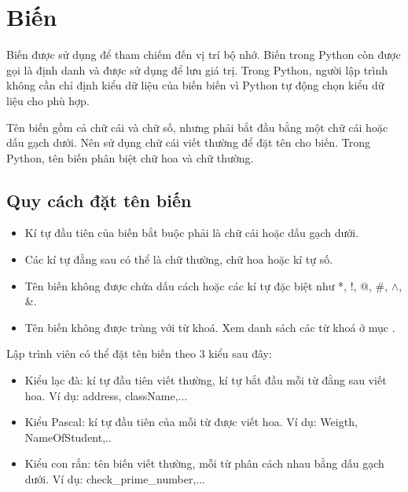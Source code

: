 \section{Biến}
Biến được sử dụng để tham chiếm đến vị trí bộ nhớ. Biến trong Python còn được gọi là định danh và được sử dụng để lưu giá trị. Trong Python, người lập trình không cần chỉ định kiểu dữ liệu của biến biến vì Python tự động chọn kiểu dữ liệu cho phù hợp.\par
Tên biến gồm cả chữ cái và chữ số, nhưng phải bắt đầu bằng một chữ cái hoặc dấu gạch dưới. Nên sử dụng chữ cái viết thường để đặt tên cho biến. Trong Python, tên biến phân biệt chữ hoa và chữ thường.\par
\subsection{Quy cách đặt tên biến}
\begin{itemize}
	\itemsep\setlength{0em}
	\item Kí tự đầu tiên của biến bắt buộc phải là chữ cái hoặc dấu gạch dưới.
	\item Các kí tự đằng sau có thể là chữ thường, chữ hoa hoặc kí tự số.
	\item Tên biến không được chứa dấu cách hoặc các kí tự đặc biệt như *, !, @, \#, $\wedge$, \&.
	\item Tên biến không được trùng với từ khoá. Xem danh sách các từ khoá ở mục .
\end{itemize}
Lập trình viên có thể đặt tên biến theo 3 kiểu sau đây:
\begin{itemize}
	\itemsep\setlength{0em}
	\item Kiểu lạc đà: kí tự đầu tiên viết thường, kí tự bắt đầu mỗi từ đằng sau viết hoa. Ví dụ: address, className,...
	\item Kiểu Pascal: kí tự đầu tiên của mỗi từ được viết hoa. Ví dụ: Weigth, NameOfStudent,..
	\item Kiểu con rắn:	tên biến viết thường, mỗi từ phân cách nhau bằng dấu gạch dưới. Ví dụ: check\_prime\_number,...
\end{itemize}
